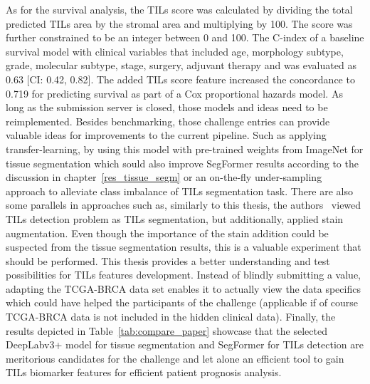As for the survival analysis, the TILs score was calculated by dividing the total predicted
TILs area by the stromal area and multiplying by 100. The score was further constrained to be
an integer between 0 and 100.
The C-index of a baseline survival model with clinical variables that included age, morphology
subtype, grade, molecular subtype, stage, surgery, adjuvant therapy and was evaluated as 0.63
[CI: 0.42, 0.82]. The added TILs score feature increased the concordance to  0.719 for predicting
survival as part of a Cox proportional hazards model. 
As long as the submission server is closed, those models and ideas need to be reimplemented.
Besides benchmarking, those challenge entries can provide valuable ideas for improvements to the current pipeline.
Such as applying transfer-learning, by using this model with pre-trained weights from ImageNet for tissue
segmentation which sould also improve SegFormer results according to the discussion in chapter~\ref{res_tissue_segm}
or an on-the-fly under-sampling approach to alleviate class imbalance of TILs segmentation task.
There are also some parallels in approaches such as, similarly to this thesis, the authors~\cite{shephard2022tiager}
viewed TILs detection problem as TILs segmentation, but additionally, applied stain augmentation. Even though the
importance of the stain addition could be
suspected from the tissue segmentation results, this is a valuable experiment that should be performed.
This thesis provides a better understanding and test possibilities for TILs features development.
Instead of blindly submitting a value, adapting the TCGA-BRCA data set enables it to actually view the data specifics
which could have helped the participants of the challenge (applicable if of course TCGA-BRCA data is not included in
the hidden clinical data).
Finally, the results depicted in Table~\ref{tab:compare_paper} showcase that the selected DeepLabv3+
model for tissue segmentation and SegFormer for TILs detection are meritorious candidates for the
challenge and let alone an efficient tool to gain TILs biomarker features for efficient patient
prognosis analysis.